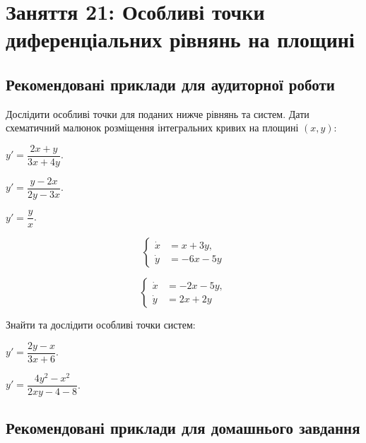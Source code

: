 \section*{Заняття 21: Особливі точки диференціальних рівнянь на площині}

\subsection*{Рекомендовані приклади для аудиторної роботи}

Дослідити особливі точки для поданих нижче рівнянь та систем. Дати схематичний малюнок розміщення інтегральних кривих на площині $(x, y)$:

\begin{problem}
	$y' = \dfrac{2 x + y}{3 x + 4 y}$.
\end{problem}

\begin{problem}
	$y' = \dfrac{y - 2 x}{2 y - 3 x}$.
\end{problem}

\begin{problem}
	$y' = \dfrac{y}{x}$.
\end{problem}

\begin{problem}
	\[\left\{ \begin{aligned} \dot x &= x + 3 y, \\ \dot y &= - 6 x - 5 y \end{aligned} \right.\]
\end{problem}

\begin{problem}
	\[\left\{ \begin{aligned} \dot x &= - 2 x - 5 y, \\ \dot y &= 2 x + 2 y \end{aligned} \right.\]
\end{problem}

Знайти та дослідити особливі точки систем:

\begin{problem}
	$y' = \dfrac{2 y - x}{3 x + 6}$.
\end{problem}

\begin{problem}
	$y' = \dfrac{4 y^2 - x^2}{2 x y - 4 - 8}$.
\end{problem}

\subsection*{Рекомендовані приклади для домашнього завдання}

